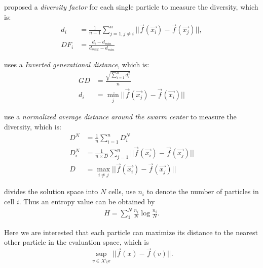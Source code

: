 \documentclass[12pt]{article}
\begin{document}
\cite{silva2013multi} proposed a \emph{diversity factor} for each single particle to measure the diversity, which is:
\begin{equation}
\begin{aligned}
d_{i} & = \frac{1}{n-1} \sum_{j=1, j \neq i}^{n} || \vec{f}(\vec{x_{i}}) - \vec{f}(\vec{x_{j}}) ||, \\
DF_{i} & = \frac{ d_{i} - d_{min} }{ d_{max} - d_{min} }
\end{aligned}
\end{equation}

\cite{coello2005solving} uses a \emph{Inverted generational distance}, which is:
\begin{equation}
\begin{aligned}
GD & = \frac{\sqrt{\sum_{i=1}^{n} d_{i}^{2} }}{n} \\
d_{i} & = \min_{j} || \vec{f}(\vec{x_{j}}) - \vec{f}(\vec{x_{i}}) ||
\end{aligned}
\end{equation}

\cite{olorunda2008measuring} use a \emph{normalized average distance around the swarm center} to measure the diversity, which is:
\begin{equation}
\begin{aligned}
D^{N} & = \frac{1}{n} \sum_{i=1}^{n} D^{N}_{i} \\
D^{N}_{i} & = \frac{1}{n \times D} \sum_{j=1}^{n} || \vec{f}( \vec{x_{i}} ) - \vec{f}( \vec{x_{j}} ) || \\
D & = \max_{i \neq j} || \vec{f}( \vec{x_{i}} ) - \vec{f}( \vec{x_{j}} ) ||
\end{aligned}
\end{equation}

\cite{pires2013entropy} divides the solution space into $ N $ cells, use $ n_{i} $ to denote the number of particles in cell $ i $. Thus an entropy value can be obtained by
\begin{equation}
\begin{aligned}
H = \sum_{1}^{N} \frac{n_{i}}{N} \log{ \frac{n_{i}}{N} }.
\end{aligned}
\end{equation}

Here we are interested that each particle can maximize its distance to the nearest other particle in the evaluation space, which is
\begin{equation}
\label{eq:diversity_dist}
\sup_{v \in X \setminus x} || \vec{f}(x) - \vec{f}(v) ||.
\end{equation}
\end{document}
